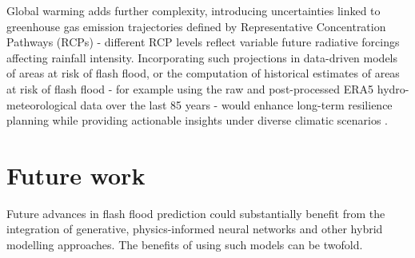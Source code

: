 Global warming adds further complexity, introducing uncertainties linked to greenhouse gas emission trajectories defined by Representative Concentration Pathways (RCPs) - different RCP levels reflect variable future radiative forcings affecting rainfall intensity. Incorporating such projections in data-driven models of areas at risk of flash flood, or the computation of historical estimates of areas at risk of flash flood - for example using the raw and post-processed ERA5 hydro-meteorological data over the last 85 years - would enhance long-term resilience planning while providing actionable insights under diverse climatic scenarios \citep{AlRawas2024}.


\section{Future work}

Future advances in flash flood prediction could substantially benefit from the integration of generative, physics-informed neural networks and other hybrid modelling approaches. The benefits of using such models can be twofold.

